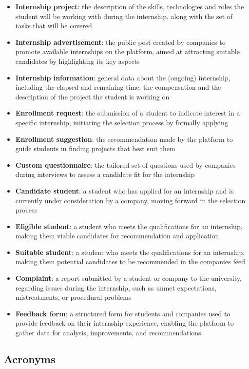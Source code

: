 \begin{itemize}
    \item \textbf{Internship project}: the description of the skills, technologies and roles the student will be working with during the internship, along with the set of tasks that will be covered
    \item \textbf{Internship advertisement}: the public post created by companies to promote available internships on the platform, aimed at attracting suitable candidates by highlighting its key aspects
    \item \textbf{Internship information}: general data about the (ongoing) internship, including the elapsed and remaining time, the compensation and the description of the project the student is working on
    \item \textbf{Enrollment request}: the submission of a student to indicate interest in a specific internship, initiating the selection process by formally applying
    \item \textbf{Enrollment suggestion}: the recommendation made by the platform to guide students in finding projects that best suit them
    \item \textbf{Custom questionnaire}: the tailored set of questions used by companies during interviews to assess a candidate fit for the internship
    \item \textbf{Candidate student}: a student who has applied for an internship and is currently under consideration by a company, moving forward in the selection process
    \item \textbf{Eligible student}: a student who meets the qualifications for an internship, making them viable candidates for recommendation and application
    \item \textbf{Suitable student}: a student who meets the qualifications for an internship, making them potential candidates to be recommended in the companies feed
    \item \textbf{Complaint}: a report submitted by a student or company to the university, regarding issues during the internship, such as unmet expectations, mistreatments, or procedural problems
    \item \textbf{Feedback form}: a structured form for students and companies used to provide feedback on their internship experience, enabling the platform to gather data for analysis, improvements, and recommendations
\end{itemize}

\subsection{Acronyms}

